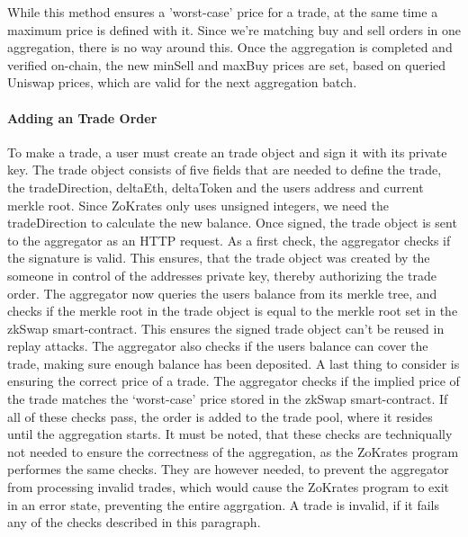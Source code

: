 \documentclass[../../thesis.tex]{subfiles}
\begin{document}
While this method ensures a 'worst-case' price for a trade, at the same time a maximum price is defined with it. Since we're matching buy and sell orders in one aggregation, there is no way around this. Once the aggregation is completed and verified on-chain, the new minSell and maxBuy prices are set, based on queried Uniswap prices, which are valid for the next aggregation batch.

\paragraph{Adding an Trade Order}
To make a trade, a user must create an trade object and sign it with its private key. The trade object consists of five fields that are needed to define the trade, the tradeDirection, deltaEth, deltaToken and the users address and current merkle root. Since ZoKrates only uses unsigned integers, we need the tradeDirection to calculate the new balance. Once signed, the trade object is sent to the aggregator as an HTTP request. As a first check, the aggregator checks if the signature is valid. This ensures, that the trade object was created by the someone in control of the addresses private key, thereby authorizing the trade order. The aggregator now queries the users balance from its merkle tree, and checks if the merkle root in the trade object is equal to the merkle root set in the zkSwap smart-contract. This ensures the signed trade object can't be reused in replay attacks. The aggregator also checks if the users balance can cover the trade, making sure enough balance has been deposited. A last thing to consider is ensuring the correct price of a trade. The aggregator checks if the implied price of the trade matches the ‘worst-case’ price stored in the zkSwap smart-contract. If all of these checks pass, the order is added to the trade pool, where it resides until the aggregation starts. It must be noted, that these checks are techniqually not needed to ensure the correctness of the aggregation, as the ZoKrates program performes the same checks. They are however needed, to prevent the aggregator from processing invalid trades, which would cause the ZoKrates program to exit in an error state, preventing the entire aggrgation. A trade is invalid, if it fails any of the checks described in this paragraph.
\end{document}
